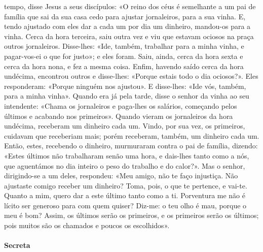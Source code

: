\begin{paracol}{2}
{ tempo, disse Jesus a seus discípulos: «O reino dos céus é semelhante a um pai de família que sai da sua casa cedo para ajustar jornaleiros, para a sua vinha. E, tendo ajustado com eles dar a cada um por dia um dinheiro, mandou-os para a vinha. Cerca da hora terceira, saiu outra vez e viu que estavam ociosos na praça outros jornaleiros. Disse-lhes: «Ide, também, trabalhar para a minha vinha, e pagar-vos-ei o que for justo»; e eles foram. Saiu, ainda, cerca da hora sexta e cerca da hora nona, e fez a mesma coisa. Enfim, havendo saído cerca da hora undécima, encontrou outros e disse-lhes: «Porque estais todo o dia ociosos?». Eles responderam: «Porque ninguém nos ajustou». E disse-lhes: «Ide vós, também, para a minha vinha». Quando era já pela tarde, disse o senhor da vinha ao seu intendente: «Chama os jornaleiros e paga-lhes os salários, começando pelos últimos e acabando nos primeiros». Quando vieram os jornaleiros da hora undécima, receberam um dinheiro cada um. Vindo, por sua vez, os primeiros, cuidavam que receberiam mais; porém receberam, também, um dinheiro cada um. Então, estes, recebendo o dinheiro, murmuraram contra o pai de família, dizendo: «Estes últimos não trabalharam senão uma hora, e dais-lhes tanto como a nós, que aguentámos no dia inteiro o peso do trabalho e do calor?». Mas o senhor, dirigindo-se a um deles, respondeu: «Meu amigo, não te faço injustiça. Não ajustaste comigo receber um dinheiro? Toma, pois, o que te pertence, e vai-te. Quanto a mim, quero dar a este último tanto como a ti. Porventura me não é lícito ser generoso para com quem quiser? Diz-me: o teu olho é mau, porque o meu é bom? Assim, os últimos serão os primeiros, e os primeiros serão os últimos; pois muitos são os chamados e poucos os escolhidos».
}\end{paracol}

\begin{paracol}{2}\switchcolumn{}\end{paracol}

\paragraph{Secreta}
\begin{paracol}{2}\switchcolumn{}\end{paracol}

